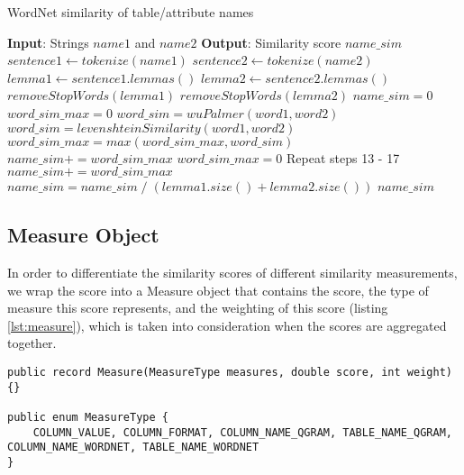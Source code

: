 \begin{algorithm}
    \caption{WordNet similarity of table/attribute names}
    \label{alg:wordnet}
    \begin{algorithmic}[1]
\STATE \textbf{Input}: Strings $name1$ and $name2$
\STATE \textbf{Output}: Similarity score $name\_sim$
\STATE $sentence1 \gets tokenize(name1)$
\STATE $sentence2 \gets tokenize(name2)$
\STATE $lemma1 \gets sentence1.lemmas()$
\STATE $lemma2 \gets sentence2.lemmas()$
\STATE $removeStopWords(lemma1)$
\STATE $removeStopWords(lemma2)$
\STATE $name\_sim=0$
\STATE $word\_sim\_max=0$
\STATE $word\_sim=wuPalmer(word1, word2)$
\STATE $word\_sim = levenshteinSimilarity(word1, word2)$
\STATE $word\_sim\_max=max(word\_sim\_max, word\_sim)$
\ENDIF
\ENDFOR
\STATE $name\_sim+=word\_sim\_max$
\ENDFOR
{}
\STATE $word\_sim\_max=0$
\STATE Repeat steps 13 - 17
\ENDFOR
\STATE $name\_sim+=word\_sim\_max$
\ENDFOR
\STATE $name\_sim = name\_sim \; / \; (lemma1.size() + lemma2.size())$
\RETURN $name\_sim$
    \end{algorithmic}
\end{algorithm}

\subsection{Measure Object}

In order to differentiate the similarity scores of different similarity measurements, we wrap the score into a Measure object that contains the score, the type of measure this score represents, and the weighting of this score (listing \ref{lst:measure}), which is taken into consideration when the scores are aggregated together. 

\begin{lstlisting}[caption=The measure object,label=lst:measure]
public record Measure(MeasureType measures, double score, int weight) {}

public enum MeasureType {
    COLUMN_VALUE, COLUMN_FORMAT, COLUMN_NAME_QGRAM, TABLE_NAME_QGRAM, COLUMN_NAME_WORDNET, TABLE_NAME_WORDNET
}
\end{lstlisting}

